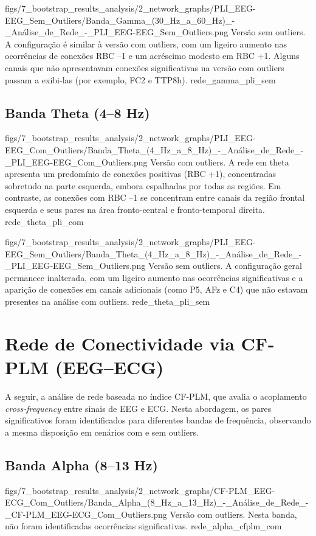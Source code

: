 \standardfigure
{figs/7_bootstrap_results_analysis/2_network_graphs/PLI_EEG-EEG_Sem_Outliers/Banda_Gamma_(30_Hz_a_60_Hz)_-_Análise_de_Rede_-_PLI_EEG-EEG_Sem_Outliers.png}
{Versão sem outliers. A configuração é similar à versão com outliers, com um ligeiro aumento nas ocorrências de conexões RBC –1 e um acréscimo modesto em RBC +1. Alguns canais que não apresentavam conexões significativas na versão com outliers passam a exibi-las (por exemplo, FC2 e TTP8h).}
{rede_gamma_pli_sem}


\subsection{Banda Theta (4–8 Hz)}
\standardfigure
{figs/7_bootstrap_results_analysis/2_network_graphs/PLI_EEG-EEG_Com_Outliers/Banda_Theta_(4_Hz_a_8_Hz)_-_Análise_de_Rede_-_PLI_EEG-EEG_Com_Outliers.png}
{Versão com outliers. A rede em theta apresenta um predomínio de conexões positivas (RBC +1), concentradas sobretudo na parte esquerda, embora espalhadas por todas as regiões. Em contraste, as conexões com RBC –1 se concentram entre canais da região frontal esquerda e seus pares na área fronto-central e fronto-temporal direita.}
{rede_theta_pli_com}

\standardfigure
{figs/7_bootstrap_results_analysis/2_network_graphs/PLI_EEG-EEG_Sem_Outliers/Banda_Theta_(4_Hz_a_8_Hz)_-_Análise_de_Rede_-_PLI_EEG-EEG_Sem_Outliers.png}
{Versão sem outliers. A configuração geral permanece inalterada, com um ligeiro aumento nas ocorrências significativas e a aparição de conexões em canais adicionais (como P5, AFz e C4) que não estavam presentes na análise com outliers.}
{rede_theta_pli_sem}


\section{Rede de Conectividade via CF‐PLM (EEG–ECG)}

A seguir, a análise de rede baseada no índice CF‐PLM, que avalia o acoplamento \emph{cross‐frequency} entre sinais de EEG e ECG. Nesta abordagem, os pares significativos foram identificados para diferentes bandas de frequência, observando a mesma disposição em cenários com e sem outliers.

\subsection{Banda Alpha (8–13 Hz)}
\standardfigure
{figs/7_bootstrap_results_analysis/2_network_graphs/CF-PLM_EEG-ECG_Com_Outliers/Banda_Alpha_(8_Hz_a_13_Hz)_-_Análise_de_Rede_-_CF-PLM_EEG-ECG_Com_Outliers.png}
{Versão com outliers. Nesta banda, não foram identificadas ocorrências significativas.}
{rede_alpha_cfplm_com}

